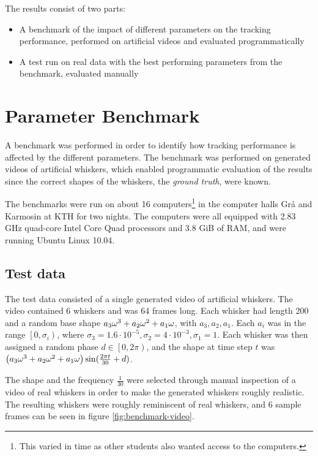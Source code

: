 The results consist of two parts:
\begin{itemize}
\item A benchmark of the impact of different parameters on the
  tracking performance, performed on artificial videos and evaluated
  programmatically
\item A test run on real data with the best performing parameters from
  the benchmark, evaluated manually
\end{itemize}

\section{Parameter Benchmark}

A benchmark was performed in order to identify how tracking
performance is affected by the different parameters. The benchmark was
performed on generated videos of artificial whiskers, which enabled
programmatic evaluation of the results since the correct shapes of the
whiskers, the \emph{ground truth}, were known.

The benchmarks were run on about 16 computers\footnote{This varied in
  time as other students also wanted access to the computers.} in the
computer halls Grå and Karmosin at KTH for two nights. The computers
were all equipped with 2.83 GHz quad-core Intel\textregistered \;
Core\texttrademark {} Quad processors and 3.8 GiB of RAM, and were
running Ubuntu Linux 10.04.

\subsection{Test data}
\label{sec:test-data}

The test data consisted of a single generated video of artificial
whiskers. The video contained 6 whiskers and was 64 frames long. Each
whisker had length 200 and a random base shape $a_3\omega^3 + a_2\omega^2 + a_1\omega$, with
$a_3, a_2, a_1$. Each $a_i$ was in the range $\left[0,
  \sigma_i\right)$, where $\sigma_3 = 1.6 \cdot 10^{-5}, \sigma_2 =
4\cdot 10^{-3}, \sigma_1 = 1$. Each whisker was then assigned a random
phase $d \in \left[0, 2\pi\right)$, and the shape at time step $t$ was
$\left(a_3\omega^3 + a_2\omega^2 + a_1\omega\right) \sin(\frac{2\pi t}{30} + d)$.

The shape and the frequency $\frac{1}{30}$ were selected through
manual inspection of a video of real whiskers in order to make the
generated whiskers roughly realistic. The resulting whiskers were
roughly reminiscent of real whiskers, and 6 sample frames can be seen
in figure \ref{fig:benchmark-video}.


